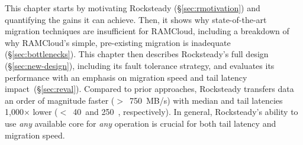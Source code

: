 This chapter starts by motivating Rocksteady (\S\ref{sec:rmotivation}) and quantifying the
gains it can achieve. Then, it shows why state-of-the-art migration techniques
are insufficient for RAMCloud, including a breakdown of why RAMCloud's simple,
pre-existing migration is inadequate
(\S\ref{sec:bottlenecks}). This chapter then describes Rocksteady's full design
(\S\ref{sec:new-design}), including its fault tolerance strategy, and
evaluates
its performance with an emphasis on migration speed and tail latency
impact~(\S\ref{sec:reval}).
Compared to prior approaches, Rocksteady transfers data an order of magnitude
faster ($>$~750~MB/s) with median and tail latencies 1,000$\times$ lower
($<$~40~\us and
250~\us, respectively). In general, Rocksteady's ability to use {\em any}
available core for {\em any} operation is crucial for both tail latency and
migration speed.
